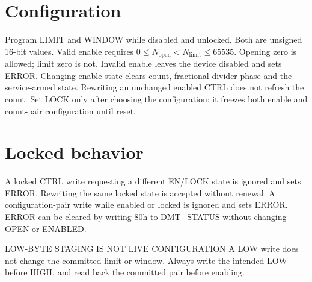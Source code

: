 \documentclass[10pt]{article}
\begin{document}
\section*{Configuration}
Program LIMIT and WINDOW while disabled and unlocked. Both are unsigned 16-bit values. Valid enable requires $0\le N_{\mathrm{open}}<N_{\mathrm{limit}}\le65535$. Opening zero is allowed; limit zero is not. Invalid enable leaves the device disabled and sets ERROR.
Changing enable state clears count, fractional divider phase and the service-armed state. Rewriting an unchanged enabled CTRL does not refresh the count. Set LOCK only after choosing the configuration: it freezes both enable and count-pair configuration until reset.
\section*{Locked behavior}
A locked CTRL write requesting a different EN/LOCK state is ignored and sets ERROR. Rewriting the same locked state is accepted without renewal. A configuration-pair write while enabled or locked is ignored and sets ERROR. ERROR can be cleared by writing 80h to DMT\_STATUS without changing OPEN or ENABLED.
\begin{Notice}{LOW-BYTE STAGING IS NOT LIVE CONFIGURATION}
A LOW write does not change the committed limit or window. Always write the intended LOW before HIGH, and read back the committed pair before enabling.
\end{Notice}

\newpage
{}
\end{document}
